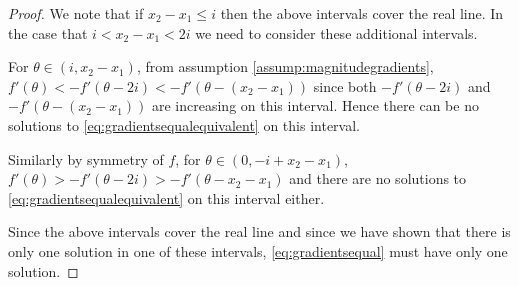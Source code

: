 \begin{proof}
			We note that if $x_2 - x_1 \leq i$ then the above intervals cover the real line. In the case that $i <x_2 - x_1 < 2i$ we need to consider these additional intervals.

			For $\theta \in (i,x_2 - x_1)$, from assumption \ref{assump:magnitudegradients}, $f'(\theta) < -f'(\theta - 2i) < -f'(\theta - (x_2 - x_1))$ since both $-f'(\theta - 2i)$ and $-f'(\theta - (x_2 - x_1))$ are increasing on this interval. Hence there can be no solutions to \eqref{eq:gradientsequalequivalent} on this interval.
			
			Similarly by symmetry of $f$, for $\theta \in (0,-i+x_2-x_1)$,  $f'(\theta)>-f'(\theta - 2i) > -f'(\theta - x_2 - x_1)$ and there are no solutions to \eqref{eq:gradientsequalequivalent} on this interval either.
			
			Since the above intervals cover the real line and since we have shown that there is only one solution in one of these intervals, \eqref{eq:gradientsequal} must have only one solution.
		\end{proof}
		
